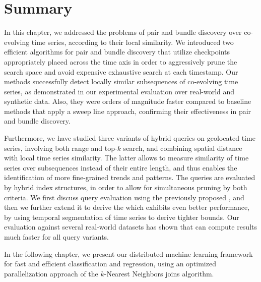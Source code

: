 
\graphicspath{{Papers/SSTD2019/}{Papers/SIGSpatial2019/}}

\section{Summary}
\label{sec:concl_local_sim}

In this chapter, we addressed the problems of pair and bundle discovery over co-evolving time series, according to their local similarity. We introduced two efficient algorithms for pair and bundle discovery that utilize checkpoints appropriately placed across the time axis in order to aggressively prune the search space and avoid expensive exhaustive search at each timestamp. Our methods successfully detect locally similar subsequences of co-evolving time series, as demonstrated in our experimental evaluation over real-world and synthetic data. Also, they were orders of magnitude faster compared to baseline methods that apply a sweep line approach, confirming their effectiveness in pair and bundle discovery.

Furthermore, we have studied three variants of hybrid queries on geolocated time series, involving both range and top-$k$ search, and combining spatial distance with local time series similarity. The latter allows to measure similarity of time series over subsequences instead of their entire length, and thus enables the identification of more fine-grained trends and patterns. The queries are evaluated by hybrid index structures, in order to allow for simultaneous pruning by both criteria. We first discuss query evaluation using the previously proposed \btsr, and then we further extend it to derive the \sbtsr which exhibits even better performance, by using temporal segmentation of time series to derive tighter bounds. Our evaluation against several real-world datasets has shown that \sbtsr can compute results much faster for all query variants.

In the following chapter, we present our distributed machine learning framework for fast and efficient classification and regression, using an optimized parallelization approach of the $k$-Nearest Neighbors joins algorithm.